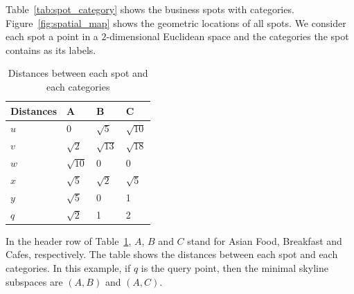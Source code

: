 Table~\ref{tab:spot_category} shows the business spots with categories. Figure~\ref{fig:spatial_map} shows the geometric locations of all spots. We consider each spot a point in a $2$-dimensional Euclidean space and the categories the spot contains as its labels.

\begin{table}[H]
    \centering
    \begin{tabular}{llll}
    \hline
    Distances & A & B & C \\ \hline
    $u$       & 0 & $\sqrt{5}$ & $\sqrt{10}$ \\ \hline
    $v$       & $\sqrt{2}$ & $\sqrt{13}$ & $\sqrt{18}$ \\ \hline
    $w$       & $\sqrt{10}$ & 0 & 0 \\ \hline
    $x$       & $\sqrt{5}$ & $\sqrt{2}$ & $\sqrt{5}$ \\ \hline
    $y$       & $\sqrt{5}$ & 0 & 1 \\ \hline
    $q$       & $\sqrt{2}$ & 1 & 2 \\ \hline
    \end{tabular}
    \caption{\label{tab:distances_spatial} Distances between each spot and each categories}
\end{table}

In the header row of Table~\ref{tab:distances_spatial}, $A$, $B$ and $C$ stand for Asian Food, Breakfast and Cafes, respectively. The table shows the distances between each spot and each categories. In this example, if $q$ is the query point, then the minimal skyline subspaces are $(A, B)$ and $(A, C)$.


